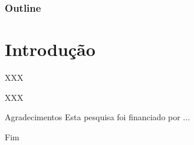 \documentclass[xcolor=pdftex,dvipsnames,table]{beamer}
\begin{document}
\begin{frame}
   \frametitle{Outline}
   \tableofcontents
\end{frame}


\section{Introdução}

\begin{frame}{XXX}
  \begin{block}{XXX}
  \end{block}
\end{frame}

\begin{frame}{Agradecimentos}
  Esta pesquisa foi financiado por ...
\end{frame}
 

\begin{frame}{Fim}
\end{frame}
\end{document}
